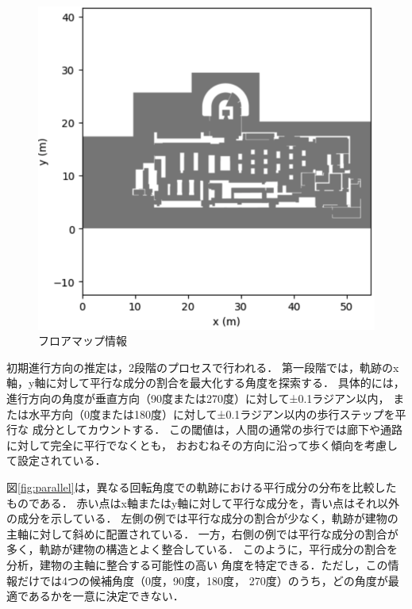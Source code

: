 \begin{figure}[H]
	\centering
	\includegraphics[width=\linewidth]{../image/floor-map.jpg}
  \caption{フロアマップ情報} \label{fig:floor-map}
\end{figure}

初期進行方向の推定は，2段階のプロセスで行われる．
第一段階では，軌跡のx軸，y軸に対して平行な成分の割合を最大化する角度を探索する．
具体的には，進行方向の角度が垂直方向（90度または270度）に対して±0.1ラジアン以内，
または水平方向（0度または180度）に対して±0.1ラジアン以内の歩行ステップを平行な
成分としてカウントする．
この閾値は，人間の通常の歩行では廊下や通路に対して完全に平行でなくとも，
おおむねその方向に沿って歩く傾向を考慮して設定されている．

図\ref{fig:parallel}は，異なる回転角度での軌跡における平行成分の分布を比較したものである．
赤い点はx軸またはy軸に対して平行な成分を，青い点はそれ以外の成分を示している．
左側の例では平行な成分の割合が少なく，軌跡が建物の主軸に対して斜めに配置されている．
一方，右側の例では平行な成分の割合が多く，軌跡が建物の構造とよく整合している．
このように，平行成分の割合を分析，建物の主軸に整合する可能性の高い
角度を特定できる．ただし，この情報だけでは4つの候補角度（0度，90度，180度，
270度）のうち，どの角度が最適であるかを一意に決定できない．

